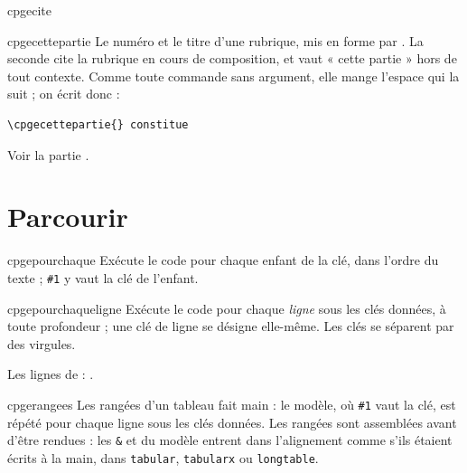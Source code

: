 \documentclass[a4paper,11pt]{article}
\begin{document}
\begin{dispExample}
\end{dispExample}

\begin{docCommand}{cpgecite}{}\end{docCommand}
\begin{docCommand}{cpgecettepartie}{}
  Le numéro et le titre d'une rubrique, mis en forme par
  . La seconde cite la rubrique en cours de
  composition, et vaut « cette partie » hors de tout contexte. Comme toute
  commande sans argument, elle mange l'espace qui la suit ; on écrit donc :
\begin{verbatim}
\cpgecettepartie{} constitue
\end{verbatim}
\end{docCommand}

\begin{dispExample}
Voir la partie .
\end{dispExample}

\section{Parcourir}

\begin{docCommand}{cpgepourchaque}{}
  Exécute le code pour chaque enfant de la clé, dans l'ordre du texte ;
  \texttt{\#1} y vaut la clé de l'enfant.
\end{docCommand}

\begin{docCommand}{cpgepourchaqueligne}{}
  Exécute le code pour chaque \emph{ligne} sous les clés données, à toute
  profondeur ; une clé de ligne se désigne elle-même. Les clés se séparent par
  des virgules.
\end{docCommand}

\begin{dispExample}
\end{dispExample}

\begin{dispExample}
Les lignes de  :
.
\end{dispExample}

\begin{docCommand}{cpgerangees}{}
  Les rangées d'un tableau fait main : le modèle, où \texttt{\#1} vaut la clé,
  est répété pour chaque ligne sous les clés données. Les rangées sont
  assemblées avant d'être rendues : les \texttt{\&} et \cs{\textbackslash} du
  modèle entrent dans l'alignement comme s'ils étaient écrits à la main, dans
  \texttt{tabular}, \texttt{tabularx} ou \texttt{longtable}.
\end{docCommand}
\end{document}
